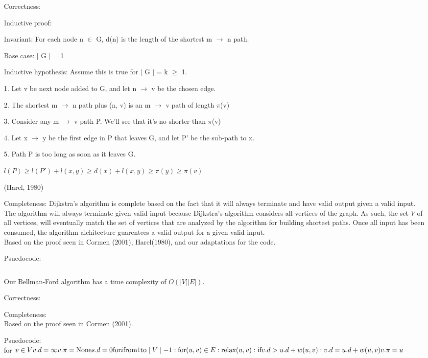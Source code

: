 \documentclass{article}
\begin{document}
Correctness: 

Inductive proof:

Invariant: For each node n $\in$ G, d(n) is the length of the shortest m $\rightarrow$ n path.

Base case: $\mid$ G $\mid$  = 1

Inductive hypothesis: Assume this is true for $\mid$ G $\mid$ = k $\geq$ 1.

1. Let v be next node added to G, and let n $\rightarrow$ v be the chosen edge.

2. The shortest m $\rightarrow$ n path plus (n, v) is an m $\rightarrow$ v path of length $\pi$(v)

3. Consider any m $\rightarrow$ v path P.
    We'll see that it's no shorter than $\pi$(v)

4. Let x $\rightarrow$ y be the first edge in P that leaves G, 
    and let P' be the sub-path to x.

5. Path P is too long as soon as it leaves G.

$l(P) \geq l(P') + l(x,y) \geq d(x) + l(x,y) \geq \pi(y) \geq \pi(v)$

(Harel, 1980)


Completeness:
Dijkstra's algorithm is complete based on the fact that it will always terminate and have valid output given a valid input.
The algorithm will always terminate given valid input because Dijkstra's algorithm considers all vertices of the graph. As such, the set $V$ of all vertices, will eventually match the set of vertices that are analyzed by the algorithm for building shortest paths.  Once all input has been consumed, the algorithm alchitecture guarentees a valid output for a given valid input.
\\Based on the proof seen in Cormen (2001), Harel(1980),  and our adaptations for the code.

Psuedocode:
\begin{verbatim}

\end{verbatim}

Our Bellman-Ford algorithm has a time complexity of $O(|V||E|)$.

Correctness:

Completeness:
\\Based on the proof seen in Cormen (2001).

Psuedocode:\\
for $v \in V\\
 v.d = \infty\\
 v.\pi = \text{None}\\
s.d = 0\\
\text{for} i \text{from} 1 \text{to} \mid V \mid -1:\\
 \text{for} (u,v) \in E:\\
  \text{relax}(u,v):\\
   \text{if} v.d > u.d + w(u,v):\\
	v.d = u.d + w(u,v)\\
	 v.\pi = u$\\
\begin{verbatim}

\end{verbatim}
\end{document}
